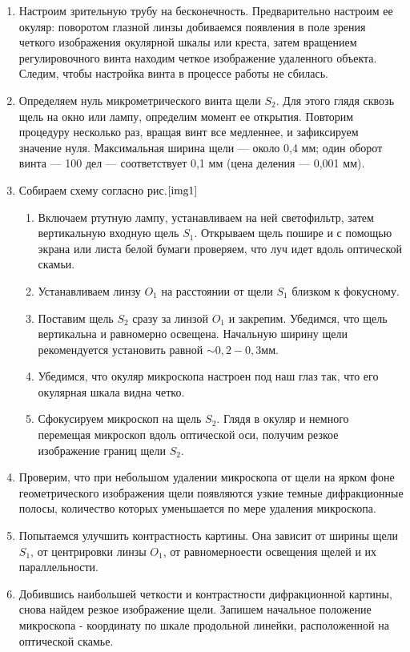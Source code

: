 \documentclass[a4paper,12pt]{article}
\begin{document}
\begin{enumerate}
    \item Настроим зрительную трубу на бесконечность. Предварительно настроим ее окуляр: поворотом глазной линзы добиваемся появления в поле зрения четкого изображения окулярной шкалы или креста, затем вращением регулировочного винта находим четкое изображение удаленного объекта. Следим, чтобы настройка винта в процессе работы не сбилась.
    \item Определяем нуль микрометрического винта щели $S_2$. Для этого глядя сквозь щель на окно или лампу, определим момент ее открытия. Повторим процедуру несколько раз, вращая винт все медленнее, и зафиксируем значение нуля. Максимальная ширина щели — около 0,4 мм; один оборот винта — 100 дел — соответствует 0,1 мм (цена деления — 0,001 мм).
    \item Собираем схему согласно рис.$\ref{img1}$
    \begin{enumerate}
        \item Включаем ртутную лампу, устанавливаем на ней светофильтр, затем вертикальную входную щель $S_1$. Открываем щель пошире и с помощью экрана или листа белой бумаги проверяем, что луч идет вдоль оптической скамьи.
        \item Устанавливаем линзу $O_1$ на расстоянии от щели $S_1$ близком к фокусному.
        \item Поставим щель $S_2$ сразу за линзой $O_1$ и закрепим. Убедимся, что щель вертикальна и равномерно освещена. Начальную ширину щели рекомендуется установить равной $\sim 0,2-0,3 \text{мм}$.
        \item Убедимся, что окуляр микроскопа настроен под наш глаз так, что его окулярная шкала видна четко.
        \item Сфокусируем микроскоп на щель $S_2$. Глядя в окуляр и немного перемещая микроскоп вдоль оптической оси, получим резкое изображение границ щели $S_2$.
    \end{enumerate}
    \item Проверим, что при небольшом удалении микроскопа от щели на ярком фоне геометрического изображения щели появляются узкие темные дифракционные полосы, количество которых уменьшается по мере удаления микроскопа.
    \item Попытаемся улучшить контрастность картины. Она зависит от ширины щели $S_1$, от центрировки линзы $O_1$, от равномерноести освещения щелей и их параллельности.
    \item Добившись наибольшей четкости и контрастности дифракционной картины, снова найдем резкое изображение щели. Запишем начальное положение микроскопа - координату по шкале продольной линейки, расположенной на оптической скамье.


\end{enumerate}
\end{document}
